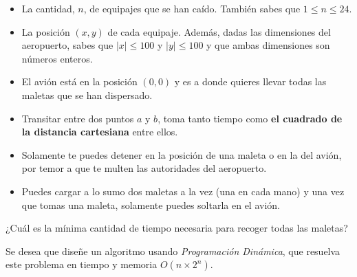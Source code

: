 \documentclass[letterpaper, 12pt]{article}
\begin{document}
\begin{enumerate}
\begin{itemize}
    \item La cantidad, $n$, de equipajes que se han caído. También sabes que $1 \leq n \leq 24$.

    \item La posición $(x, y)$ de cada equipaje. Además, dadas las dimensiones del aeropuerto, sabes que $|x| \leq 100$ y $|y| \leq 100$ y que ambas dimensiones son números enteros.
    \item El avión está en la posición $(0, 0)$ y es a donde quieres llevar todas las maletas que se han dispersado.
    \item Transitar entre dos puntos $a$ y $b$, toma tanto tiempo como \textbf{el cuadrado de la distancia cartesiana} entre ellos.
    \item Solamente te puedes detener en la posición de una maleta o en la del avión, por temor a que te multen las autoridades del aeropuerto.
    \item Puedes cargar a lo sumo dos maletas a la vez (una en cada mano) y una vez que tomas una maleta, solamente puedes soltarla en el avión.
\end{itemize}

¿Cuál es la mínima cantidad de tiempo necesaria para recoger todas las maletas?

Se desea que diseñe un algoritmo usando \emph{Programación Dinámica}, que resuelva este problema en tiempo y memoria $O(n \times 2^n)$.

%
%


%
%
%


\end{enumerate} \vspace{4mm}
\end{document}
